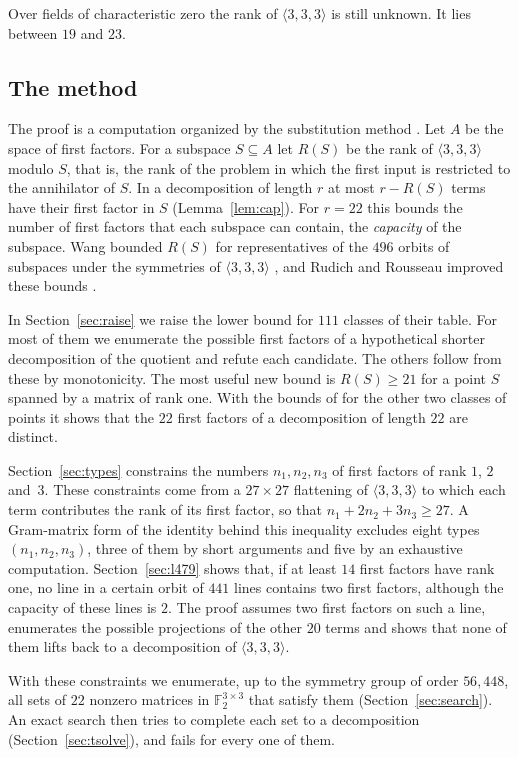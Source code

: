\documentclass[11pt]{amsart}
\theoremstyle{definition}
\theoremstyle{remark}
\numberwithin{equation}{section}
\newcommand{\F}{\mathbb{F}_2}
\newcommand{\mm}{\langle 3,3,3\rangle}
\begin{document}
Over fields of characteristic zero the rank of $\mm$ is still unknown. It lies between $19$ and $23$.

\subsection*{The method}
The proof is a computation organized by the substitution method \cite{Pan66,AFT11,LM17,Bla03,Bla13}. Let $A$ be the space of first factors. For a subspace $S\subseteq A$ let $R(S)$ be the rank of $\mm$ modulo $S$, that is, the rank of the problem in which the first input is restricted to the annihilator of $S$. In a decomposition of length $r$ at most $r-R(S)$ terms have their first factor in $S$ (Lemma~\ref{lem:cap}). For $r=22$ this bounds the number of first factors that each subspace can contain, the \emph{capacity} of the subspace. Wang bounded $R(S)$ for representatives of the $496$ orbits of subspaces under the symmetries of $\mm$ \cite{Wan26a}, and Rudich and Rousseau improved these bounds \cite{RR26}.

In Section~\ref{sec:raise} we raise the lower bound for $111$ classes of their table. For most of them we enumerate the possible first factors of a hypothetical shorter decomposition of the quotient and refute each candidate. The others follow from these by monotonicity. The most useful new bound is $R(S)\ge 21$ for a point $S$ spanned by a matrix of rank one. With the bounds of \cite{RR26} for the other two classes of points it shows that the $22$ first factors of a decomposition of length $22$ are distinct.

Section~\ref{sec:types} constrains the numbers $n_1,n_2,n_3$ of first factors of rank $1$, $2$ and~$3$. These constraints come from a $27\times 27$ flattening of $\mm$ to which each term contributes the rank of its first factor, so that $n_1+2n_2+3n_3\ge 27$. A Gram-matrix form of the identity behind this inequality excludes eight types $(n_1,n_2,n_3)$, three of them by short arguments and five by an exhaustive computation. Section~\ref{sec:l479} shows that, if at least $14$ first factors have rank one, no line in a certain orbit of $441$ lines contains two first factors, although the capacity of these lines is $2$. The proof assumes two first factors on such a line, enumerates the possible projections of the other $20$ terms and shows that none of them lifts back to a decomposition of $\mm$.

With these constraints we enumerate, up to the symmetry group of order $56{,}448$, all sets of $22$ nonzero matrices in $\F^{3\times 3}$ that satisfy them (Section~\ref{sec:search}). An exact search then tries to complete each set to a decomposition (Section~\ref{sec:tsolve}), and fails for every one of them.
\end{document}
